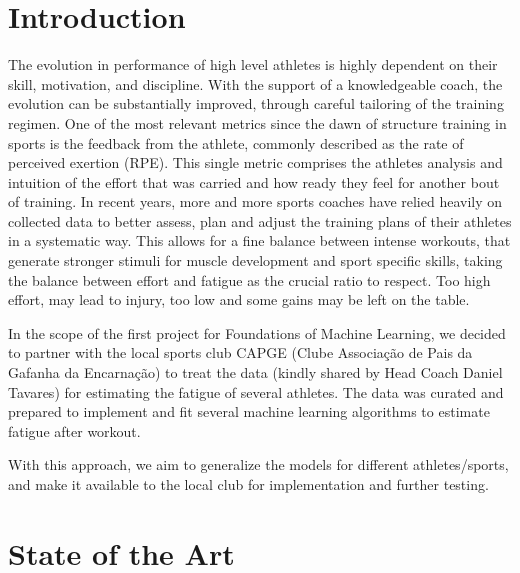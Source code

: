 \documentclass[conference]{IEEEtran}
\begin{document}
\IEEEpeerreviewmaketitle


\section{Introduction}
The evolution in performance of high level athletes is highly dependent on their skill, motivation, and discipline. With the support of a knowledgeable coach, the evolution can be substantially improved, through careful tailoring of the training regimen. One of the most relevant metrics since the dawn of structure training in sports is the feedback from the athlete, commonly described as the rate of perceived exertion (RPE). This single metric comprises the athletes analysis and intuition of the effort that was carried and how ready they feel for another bout of training. In recent years, more and more sports coaches have relied heavily on collected data to better assess, plan and adjust the training plans of their athletes in a systematic way. This allows for a fine balance between intense workouts, that generate stronger stimuli for muscle development and sport specific skills, taking the balance between effort and fatigue as the crucial ratio to respect. Too high effort, may lead to injury, too low and some gains may be left on the table. 

In the scope of the first project for Foundations of Machine Learning, we decided to partner with the local sports club CAPGE (Clube Associação de Pais da Gafanha da Encarnação) to treat the data (kindly shared by Head Coach Daniel Tavares) for estimating the fatigue of several athletes. The data was curated and prepared to implement and fit several machine learning algorithms to estimate fatigue after workout.

With this approach, we aim to generalize the models for different athletes/sports, and make it available to the local club for implementation and further testing. 



\section{State of the Art}
\end{document}
